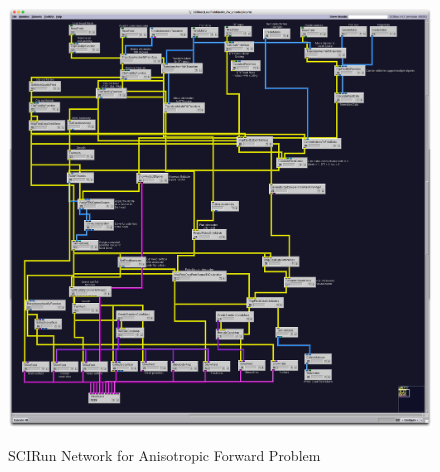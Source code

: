 \begin{figure}[p]
\begin{center}
\includegraphics[width=\textwidth]{Figures/aniso_network.png}\\
\caption{SCIRun Network for Anisotropic Forward Problem}
\label{fig:anisofornet}
\end{center}
\end{figure}

